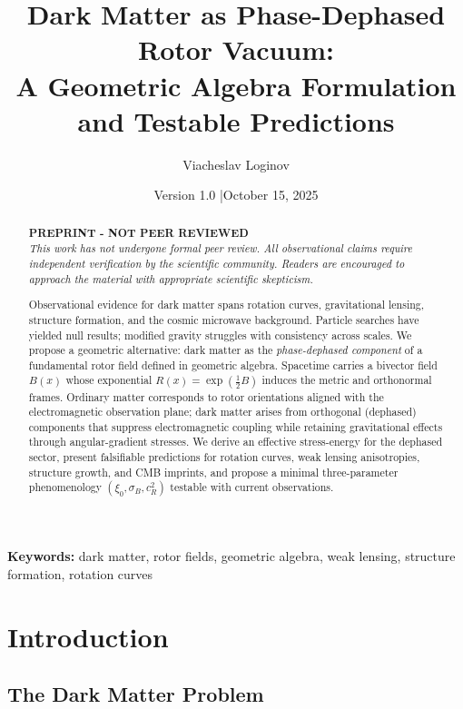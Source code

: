 \documentclass[11pt,a4paper]{article}
\title{\textbf{Dark Matter as Phase-Dephased Rotor Vacuum:\\
A Geometric Algebra Formulation and Testable Predictions}}
\author[1]{Viacheslav Loginov}
\affil[1]{Kyiv, Ukraine\\ \texttt{barthez.slavik@gmail.com}}
\date{\small Version 1.0 \quad|\quad October 15, 2025}
\numberwithin{equation}{section}
\theoremstyle{plain}
\theoremstyle{definition}
\theoremstyle{remark}
\begin{document}
\maketitle

\begin{abstract}
\noindent
\textbf{PREPRINT - NOT PEER REVIEWED}\\
\textit{This work has not undergone formal peer review. All observational claims require independent verification by the scientific community. Readers are encouraged to approach the material with appropriate scientific skepticism.}

\medskip
\noindent\noindent
Observational evidence for dark matter spans rotation curves, gravitational lensing, structure formation, and the cosmic microwave background. Particle searches have yielded null results; modified gravity struggles with consistency across scales. We propose a geometric alternative: dark matter as the \emph{phase-dephased component} of a fundamental rotor field defined in geometric algebra. Spacetime carries a bivector field $B(x)$ whose exponential $R(x)=\exp(\tfrac12 B)$ induces the metric and orthonormal frames. Ordinary matter corresponds to rotor orientations aligned with the electromagnetic observation plane; dark matter arises from orthogonal (dephased) components that suppress electromagnetic coupling while retaining gravitational effects through angular-gradient stresses. We derive an effective stress-energy for the dephased sector, present falsifiable predictions for rotation curves, weak lensing anisotropies, structure growth, and CMB imprints, and propose a minimal three-parameter phenomenology $(\xi_0,\sigma_B,c_R^2)$ testable with current observations.
\end{abstract}

\noindent\textbf{Keywords:} dark matter, rotor fields, geometric algebra, weak lensing, structure formation, rotation curves

\vspace{1em}

\section{Introduction}\label{sec:intro}

\subsection{The Dark Matter Problem}
\end{document}
